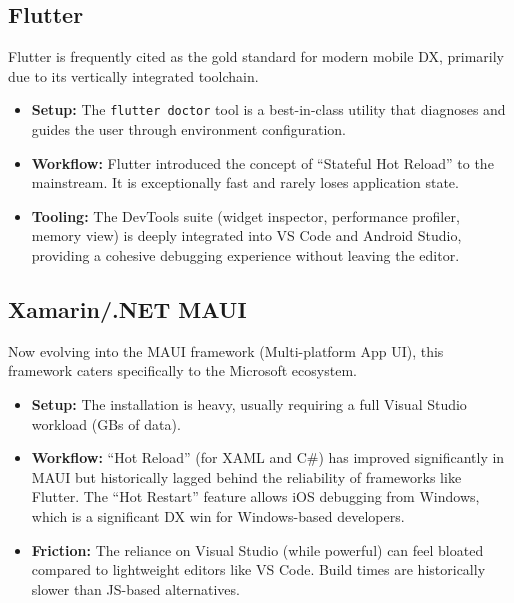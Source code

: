 \subsection{Flutter}
Flutter is frequently cited as the gold standard for modern mobile DX, primarily due to its vertically integrated toolchain.
\begin{itemize}
    \item \textbf{Setup:} The \texttt{flutter doctor} tool is a best-in-class utility that diagnoses and guides the user through environment configuration.~\cite{DX:FT:01}
    \item \textbf{Workflow:} Flutter introduced the concept of ``Stateful Hot Reload'' to the mainstream. It is exceptionally fast and rarely loses application state.~\cite{DX:FT:02}
    \item \textbf{Tooling:} The DevTools suite (widget inspector, performance profiler, memory view) is deeply integrated into VS Code and Android Studio, providing a cohesive debugging experience without leaving the editor.
\end{itemize}

\subsection{Xamarin/.NET MAUI}
Now evolving into the MAUI framework (Multi-platform App UI), this framework caters specifically to the Microsoft ecosystem.
\begin{itemize}
    \item \textbf{Setup:} The installation is heavy, usually requiring a full Visual Studio workload (GBs of data).~\cite{DX:NET:01}
    \item \textbf{Workflow:} ``Hot Reload'' (for XAML and C\#) has improved significantly in MAUI but historically lagged behind the reliability of frameworks like Flutter. The ``Hot Restart'' feature allows iOS debugging from Windows, which is a significant DX win for Windows-based developers.~\cite{DX:NET:02}
    \item \textbf{Friction:} The reliance on Visual Studio (while powerful) can feel bloated compared to lightweight editors like VS Code. Build times are historically slower than JS-based alternatives.
\end{itemize}


